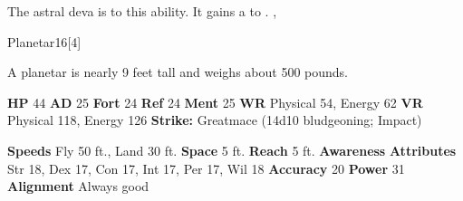               The astral deva is  to this ability.
              It gains a   to .
  ,
  \begin{monsubsection}{Planetar}{16}[4]
    \vspace{-1em}\vspace{-1em}
    \vspace{0em}

    
          A planetar is nearly 9 feet tall and weighs about 500 pounds.
        
    

    \begin{spellcontent}
      \begin{spelltargetinginfo}
        \pari \textbf{HP} 44 \monsep
          \textbf{AD} 25 \monsep
          \textbf{Fort} 24 \monsep
          \textbf{Ref} 24 \monsep
          \textbf{Ment} 25
        \pari \textbf{WR} Physical 54, Energy 62 \monsep
        \textbf{VR} Physical 118, Energy 126
        \pari \textbf{Strike:}
            Greatmace  (14d10 bludgeoning; Impact)
      \end{spelltargetinginfo}
    \end{spellcontent}
    \begin{monsterfooter}
      \pari \textbf{Speeds} Fly 50 ft., Land 30 ft. \monsep
        \textbf{Space} 5 ft. \monsep
        \textbf{Reach} 5 ft.
      \pari \textbf{Awareness} 
      \pari \textbf{Attributes}
        Str 18, Dex 17,
        Con 17, Int 17,
        Per 17, Wil 18
      \pari \textbf{Accuracy} 20 \monsep
        \textbf{Power} 31
      \pari \textbf{Alignment} Always good
    \end{monsterfooter}
  \end{monsubsection}
  
